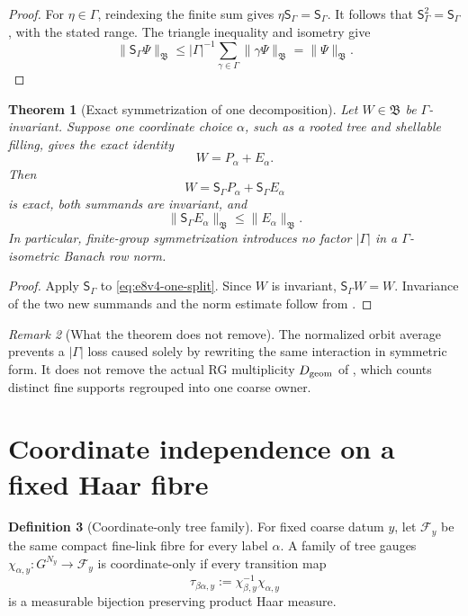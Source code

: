 \documentclass[11pt,oneside]{book}
\newtheorem{theorem}{Theorem}[chapter]
\theoremstyle{definition}
\newtheorem{definition}[theorem]{Definition}
\theoremstyle{remark}
\newtheorem{remark}[theorem]{Remark}
\begin{document}
\begin{proof}
For \(\eta\in\Gamma\), reindexing the finite sum gives
\(\eta{\mathsf S}_{\Gamma}={\mathsf S}_{\Gamma}\).  It follows that
\({\mathsf S}_{\Gamma}^2={\mathsf S}_{\Gamma}\), with the stated
range.  The triangle inequality and isometry give
\[
 \|{\mathsf S}_{\Gamma}\Psi\|_{\mathfrak B}
 \leq |\Gamma|^{-1}\sum_{\gamma\in\Gamma}
       \|\gamma\Psi\|_{\mathfrak B}
 =\|\Psi\|_{\mathfrak B}.
\]
\end{proof}

\begin{theorem}[Exact symmetrization of one decomposition]
\label{thm:e8v4-exact-sym}
Let \(W\in{\mathfrak B}\) be \(\Gamma\)-invariant.  Suppose one
coordinate choice \(\alpha\), such as a rooted tree and shellable
filling, gives the exact identity
\[
 W=P_\alpha+E_\alpha .                               \label{eq:e8v4-one-split}
\]
Then
\[
 W={\mathsf S}_{\Gamma}P_\alpha+
   {\mathsf S}_{\Gamma}E_\alpha                      \label{eq:e8v4-sym-split}
\]
is exact, both summands are invariant, and
\[
 \|{\mathsf S}_{\Gamma}E_\alpha\|_{\mathfrak B}
 \leq \|E_\alpha\|_{\mathfrak B}.                    \label{eq:e8v4-tail-no-loss}
\]
In particular, finite-group symmetrization introduces no factor
\(|\Gamma|\) in a \(\Gamma\)-isometric Banach row norm.
\end{theorem}

\begin{proof}
Apply \({\mathsf S}_{\Gamma}\) to
\eqref{eq:e8v4-one-split}.  Since \(W\) is invariant,
\({\mathsf S}_{\Gamma}W=W\).  Invariance of the two new summands and
the norm estimate follow from .
\end{proof}

\begin{remark}[What the theorem does not remove]
\label{rem:e8v4-geom}
The normalized orbit average prevents a \(|\Gamma|\) loss caused
solely by rewriting the same interaction in symmetric form.  It does
not remove the actual RG multiplicity \(D_{\rm geom}\) of
, which counts distinct fine supports
regrouped into one coarse owner.
\end{remark}

\section{Coordinate independence on a fixed Haar fibre}
\label{sec:e8v4-coordinate}

\begin{definition}[Coordinate-only tree family]
\label{def:e8v4-coordinate}
For fixed coarse datum \(y\), let \({\mathcal F}_y\) be the same
compact fine-link fibre for every label \(\alpha\).  A family of tree
gauges \(\chi_{\alpha,y}:G^{N_y}\to{\mathcal F}_y\) is
coordinate-only if every transition map
\[
 \tau_{\beta\alpha,y}:=
 \chi_{\beta,y}^{-1}\chi_{\alpha,y}                  \label{eq:e8v4-transition}
\]
is a measurable bijection preserving product Haar measure.
\end{definition}
\end{document}
